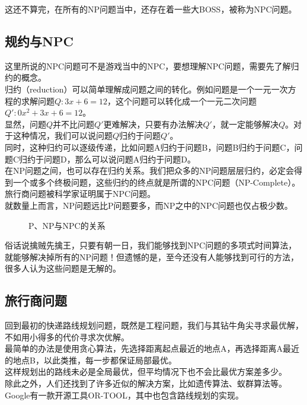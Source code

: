 这还不算完，在所有的NP问题当中，还存在着一些大BOSS，被称为NPC问题。\\

\subsection{规约与NPC}

这里所说的NPC问题可不是游戏当中的NPC，要想理解NPC问题，需要先了解归约的概念。\\

归约（reduction）可以简单理解成问题之间的转化。例如问题是一个一元一次方程的求解问题$ Q: 3x + 6 = 12 $，这个问题可以转化成一个一元二次问题$ Q': 0x^2 + 3x + 6 = 12 $。\\

显然，问题$ Q $并不比问题$ Q' $更难解决，只要有办法解决$ Q' $，就一定能够解决$ Q $。对于这种情况，我们可以说问题$ Q $归约于问题$ Q' $。\\

同时，这种归约可以逐级传递，比如问题A归约于问题B，问题B归约于问题C，问题C归约于问题D，那么可以说问题A归约于问题D。\\

在NP问题之间，也可以存在归约关系。我们把众多的NP问题层层归约，必定会得到一个或多个终极问题，这些归约的终点就是所谓的NPC问题（NP-Complete）。旅行商问题被科学家证明属于NPC问题。\\

就数量上而言，NP问题远比P问题要多，而NP之中的NPC问题也仅占极少数。

\begin{figure}[H]
	\centering
	\caption{P、NP与NPC的关系}
\end{figure}

俗话说擒贼先擒王，只要有朝一日，我们能够找到NPC问题的多项式时间算法，就能够解决掉所有的NP问题！但遗憾的是，至今还没有人能够找到可行的方法，很多人认为这些问题是无解的。\\

\subsection{旅行商问题}

回到最初的快递路线规划问题，既然是工程问题，我们与其钻牛角尖寻求最优解，不如用小得多的代价寻求次优解。\\

最简单的办法是使用贪心算法，先选择距离起点最近的地点A，再选择距离A最近的地点B，以此类推，每一步都保证局部最优。\\

这样规划出的路线未必是全局最优，但平均情况下也不会比最优方案差多少。\\

除此之外，人们还找到了许多近似的解决方案，比如遗传算法、蚁群算法等。Google有一款开源工具OR-TOOL，其中也包含路线规划的实现。

\newpage